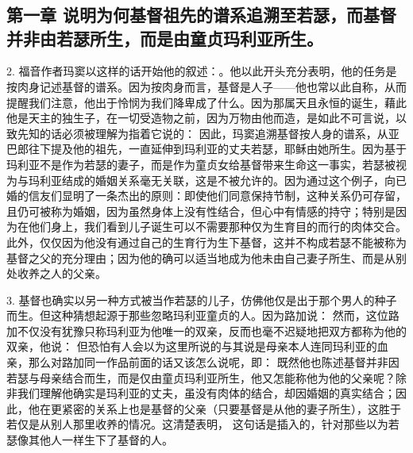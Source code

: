 

\section{}


\subsection{第一章 说明为何基督祖先的谱系追溯至若瑟，而基督并非由若瑟所生，而是由童贞玛利亚所生。}

2. 福音作者玛窦以这样的话开始他的叙述：。他以此开头充分表明，他的任务是按肉身记述基督的谱系。因为按肉身而言，基督是人子——他也常以此自称，从而提醒我们注意，他出于怜悯为我们降卑成了什么。因为那属天且永恒的诞生，藉此他是天主的独生子，在一切受造物之前，因为万物由他而造，是如此不可言说，以致先知的话必须被理解为指着它说的： 因此，玛窦追溯基督按人身的谱系，从亚巴郎往下提及他的祖先，一直延伸到玛利亚的丈夫若瑟，耶稣由她所生。因为基于玛利亚不是作为若瑟的妻子，而是作为童贞女给基督带来生命这一事实，若瑟被视为与玛利亚结成的婚姻关系毫无关联，这是不被允许的。因为通过这个例子，向已婚的信友们显明了一条杰出的原则：即使他们同意保持节制，这种关系仍可存留，且仍可被称为婚姻，因为虽然身体上没有性结合，但心中有情感的持守；特别是因为在他们身上，我们看到儿子诞生可以不需要那种仅为生育目的而行的肉体交合。此外，仅仅因为他没有通过自己的生育行为生下基督，这并不构成若瑟不能被称为基督之父的充分理由；因为他的确可以适当地成为他未由自己妻子所生、而是从别处收养之人的父亲。\par

3. 基督也确实以另一种方式被当作若瑟的儿子，仿佛他仅是出于那个男人的种子而生。但这种猜想起源于那些忽略玛利亚童贞的人。因为路加说：   然而，这位路加不仅没有犹豫只称玛利亚为他唯一的双亲，反而也毫不迟疑地把双方都称为他的双亲，他说： 但恐怕有人会以为这里所说的与其说是母亲本人连同玛利亚的血亲，那么对路加同一作品前面的话又该怎么说呢，即： 既然他也陈述基督并非因若瑟与母亲结合而生，而是仅由童贞玛利亚所生，他又怎能称他为他的父亲呢？除非我们理解他确实是玛利亚的丈夫，虽没有肉体的结合，却因婚姻的真实结合；因此，他在更紧密的关系上也是基督的父亲（只要基督是从他的妻子所生），这胜于若仅是从别人那里收养的情况。这清楚表明， 这句话是插入的，针对那些以为若瑟像其他人一样生下了基督的人。\par

